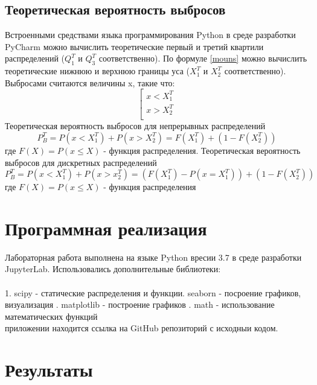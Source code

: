 \documentclass[a4paper]{article}
\begin{document}
\subsection{Теоретическая вероятность выбросов}
	\noindent Встроенными средствами языка программирования Python в среде разработки PyCharm можно вычислить теоретические первый и третий квартили распределений ($Q_1^T$ и $Q_3^T$ соответственно). По формуле \eqref{mouns} можно вычислить теоретические нижнюю и верхнюю границы уса ($X_1^T$ и $X_2^T$ соответственно). Выбросами считаются величины x, такие что: 
	\begin{equation}
		\left[
		\begin{gathered}
		x < X_1^T \\
		x > X_2^T \\
		\end{gathered}
		\right.
	\end{equation}
	Теоретическая вероятность выбросов для непрерывных распределений
	\begin{equation}
		P_B^T = P(x<X_1^T) + P(x>X_2^T)=F(X_1^T) + (1-F(X_2^T))
	\end{equation}
	где $F(X)=P(x\leq{X})$ - функция распределения.
	Теоретическая вероятность выбросов для дискретных распределений
	\begin{equation}
		P_B^T = P(x<X_1^T)+P(x>x_2^T)=(F(X_1^T)-P(x=X_1^T))+(1-F(X_2^T))
	\end{equation}
	где $F(X) = P(x\leq{X})$ - функция распределения
	
\section{Программная реализация}
\noindent Лабораторная работа выполнена на языке Python вресии 3.7 в среде разработки JupyterLab. Использовались дополнительные библиотеки:\\\\ 
1. scipy - статические распределения и функции. seaborn - посроение графиков, визуализация . matplotlib - построение графиков . math - использование математических функций\\

 приложении находится ссылка на GitHub репозиторий с исходныи кодом.

\section {Результаты} 
\end{document}
